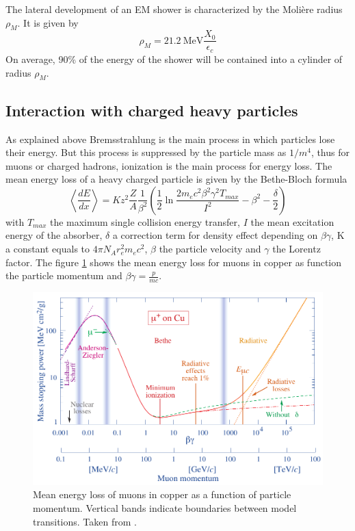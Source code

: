 The lateral development of an EM shower is characterized by the Moli\`ere radius $\rho_{M}$. It is given by \cite{Wigmans:392793}
\begin{equation}
  \rho_{M} = \SI{21.2}{\mega\eV} \frac{X_0}{\epsilon_c}
\end{equation}
On average, 90\% of the energy of the shower will be contained into a cylinder of radius $\rho_{M}$.

\subsection{Interaction with charged heavy particles}

As explained above Bremsstrahlung is the main process in which particles lose their energy. But this process is suppressed by the particle mass as $1/m^4$, thus for muons or charged hadrons, ionization is the main process for energy loss. The mean energy loss of a heavy charged particle is given by the Bethe-Bloch formula \cite{Wigmans:392793}
\begin{equation}
  \left<\frac{dE}{dx}\right> = Kz^2\frac{Z}{A}\frac{1}{\beta^2}\left(\frac{1}{2}\ln\frac{2m_ec^2\beta^2\gamma^2T_{max}}{I^2} - \beta^2 - \frac{\delta}{2}\right)
\end{equation}
with $T_{max}$ the maximum single collision energy transfer, $I$ the mean excitation energy of the absorber, $\delta$ a correction term for density effect depending on $\beta\gamma$, K a constant equals to $4\pi{}N_Ar_e^2m_ec^2$, $\beta$ the particle velocity and $\gamma$ the Lorentz factor. The figure \ref{fig:BetheBloch} shows the mean energy loss for muons in copper as function the particle momentum and $\beta\gamma = \frac{p}{mc}$.

\begin{figure}[htbp!]
  \centering
  \includegraphics[width=0.7\linewidth]{chap2/fig/rpp_icru49_cu_col.pdf}
  \caption{Mean energy loss of muons in copper as a function of particle momentum. Vertical bands indicate boundaries between model transitions. Taken from \cite{Patrignani:2016xqp}.} \label{fig:BetheBloch}
\end{figure}


